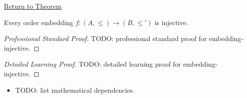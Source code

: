\newpage
{}
\label{prf:embedding-injective}

\begin{remark*}[Return]
\hyperref[prop:embedding-injective]{Return to Theorem}
\end{remark*}

\begin{theorem*}
Every order embedding $f : (A, \leq) \to (B, \leq')$ is injective.
\end{theorem*}

\begin{proof}[Professional Standard Proof]
\LRAProofBodyStart
TODO: professional standard proof for embedding-injective.
\end{proof}

\begin{proof}[Detailed Learning Proof]
\LRAProofBodyStart
TODO: detailed learning proof for embedding-injective.
\end{proof}

\begin{remark*}
\end{remark*}

\begin{dependencies}
\begin{itemize}
  \item TODO: list mathematical dependencies.
\end{itemize}
\end{dependencies}

\clearpage
